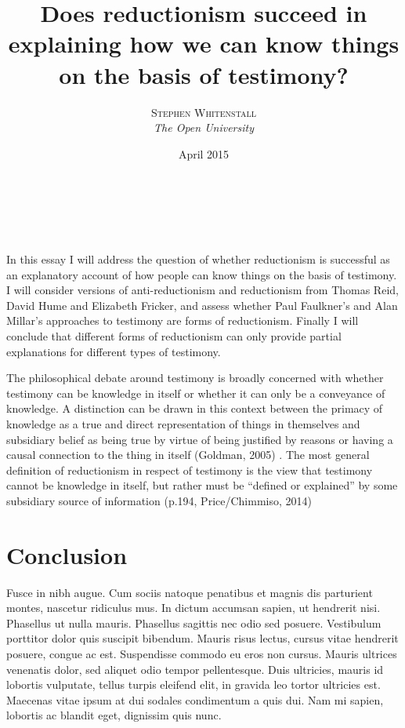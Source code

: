 \documentclass[a4paper, 11pt]{article} %
\title{\textbf{Does reductionism succeed in explaining how we can know things on the basis of testimony?}\\ %
}
\author{\textsc{Stephen Whitenstall} %
\\{\textit{The Open University}}} %
\date{April 2015}
\makeatletter
\renewcommand{\maketitle}{ %
\begin{flushright} %
{\LARGE\@title} %

\vspace{50pt} %

{\large\@author} %
\\\@date %

\vspace{40pt} %
\end{flushright}
}
\makeatother
\begin{document}
\maketitle %



\section*{}

In this essay I will address the question of whether reductionism is successful as an explanatory account of how people can know things on the basis of testimony. I will consider versions of anti-reductionism and reductionism from Thomas Reid, David Hume and Elizabeth Fricker, and assess whether Paul Faulkner's and Alan Millar's approaches to testimony are forms of reductionism. Finally I will conclude that different forms of reductionism can only provide partial explanations for different types of testimony.

\vspace{10pt}

The philosophical debate around testimony is broadly concerned with whether testimony can be knowledge in itself or whether it can only be a conveyance of knowledge. A distinction can be drawn in this context between the primacy of knowledge as a true and direct representation of things in themselves and subsidiary belief as being true by virtue of being justified by reasons or having a causal connection to the thing in itself (Goldman, 2005) \cite{Goldman:2005}. The most general definition of reductionism in respect of testimony is the view that testimony cannot be knowledge in itself, but rather must be “defined or explained” by some subsidiary source of information (p.194, Price/Chimmiso, 2014) \cite{Price/Chismisso:2014}

\vspace{10pt}

\section*{Conclusion}

Fusce in nibh augue. Cum sociis natoque penatibus et magnis dis parturient montes, nascetur ridiculus mus. In dictum accumsan sapien, ut hendrerit nisi. Phasellus ut nulla mauris. Phasellus sagittis nec odio sed posuere. Vestibulum porttitor dolor quis suscipit bibendum. Mauris risus lectus, cursus vitae hendrerit posuere, congue ac est. Suspendisse commodo eu eros non cursus. Mauris ultrices venenatis dolor, sed aliquet odio tempor pellentesque. Duis ultricies, mauris id lobortis vulputate, tellus turpis eleifend elit, in gravida leo tortor ultricies est. Maecenas vitae ipsum at dui sodales condimentum a quis dui. Nam mi sapien, lobortis ac blandit eget, dignissim quis nunc.
\end{document}
